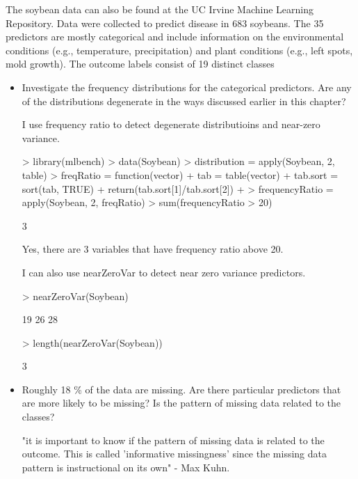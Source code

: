 \documentclass[12pt]{article}
\begin{document}
The soybean data can also be found at the UC Irvine Machine Learning Repository. Data were collected to predict disease in 683 soybeans. The 35 predictors are mostly categorical and include information on the environmental conditions (e.g., temperature, precipitation) and plant conditions (e.g., left spots, mold growth). The outcome labels consist of 19 distinct classes
\begin{itemize}
\item
Investigate the frequency distributions for the categorical predictors. Are any of the distributions degenerate in the ways discussed earlier in this chapter?

I use frequency ratio to detect degenerate distributioins and near-zero variance. 

\begin{Schunk}
\begin{Sinput}
> library(mlbench)
> data(Soybean)
> distribution = apply(Soybean, 2, table)
> freqRatio = function(vector){
+   tab = table(vector)
+   tab.sort = sort(tab, TRUE)
+   return(tab.sort[1]/tab.sort[2])
+ }
> frequencyRatio = apply(Soybean, 2, freqRatio)
> sum(frequencyRatio > 20)
\end{Sinput}
\begin{Soutput}
[1] 3
\end{Soutput}
\end{Schunk}
Yes, there are 3 variables that have frequency ratio above 20. 

I can also use nearZeroVar to detect near zero variance predictors. 
\begin{Schunk}
\begin{Sinput}
> nearZeroVar(Soybean)
\end{Sinput}
\begin{Soutput}
[1] 19 26 28
\end{Soutput}
\begin{Sinput}
> length(nearZeroVar(Soybean))
\end{Sinput}
\begin{Soutput}
[1] 3
\end{Soutput}
\end{Schunk}

\item
Roughly 18 \% of the data are missing. Are there particular predictors that are more likely to be missing? Is the pattern of missing data related to the classes?

"it is important to know if the pattern of missing data is related to
the outcome. This is called 'informative missingness' since the missing data
pattern is instructional on its own" - Max Kuhn.


\end{itemize}
\end{document}
